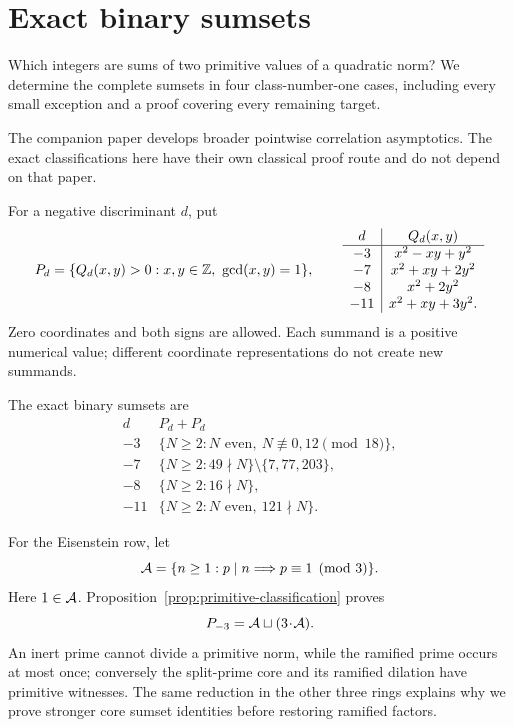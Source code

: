 \section{Exact binary sumsets}

Which integers are sums of two primitive values of a quadratic norm?
We determine the complete sumsets in four class-number-one cases,
including every small exception and a proof covering every remaining
target.

The companion paper \cite{pointwisecompanion} develops broader pointwise
correlation asymptotics. The exact classifications here have their own
classical proof route and do not depend on that paper.

For a negative discriminant $d$, put
\[
 P_d=\{Q_d(x,y)>0:x,y\in\Z,\ \gcd(x,y)=1\},\qquad
 \begin{array}{c|c}
 d&Q_d(x,y)\\\hline
 -3&x^2-xy+y^2\\
 -7&x^2+xy+2y^2\\
 -8&x^2+2y^2\\
 -11&x^2+xy+3y^2.
 \end{array}
\]
Zero coordinates and both signs are allowed.  Each summand is a positive
numerical value; different coordinate representations do not create
new summands.

\begin{theorem}\label{thm:exact-overview}
The exact binary sumsets are
\[
\begin{array}{c|l}
 d&P_d+P_d\\\hline
 -3&\{N\ge2:N\text{ even},\ N\not\equiv0,12\pmod{18}\},\\
 -7&\{N\ge2:49\nmid N\}\setminus\{7,77,203\},\\
 -8&\{N\ge2:16\nmid N\},\\
 -11&\{N\ge2:N\text{ even},\ 121\nmid N\}.
\end{array}
\]
\end{theorem}

For the Eisenstein row, let
\[
 \AA=\{n\ge1:p\mid n\Longrightarrow p\equiv1\pmod3\}.
\]
Here \(1\in\AA\). Proposition~\ref{prop:primitive-classification} proves
\[
                    P_{-3}=\AA\sqcup(3\!\cdot\!\AA).
\]
An inert prime cannot divide a primitive norm, while the ramified
prime occurs at most once; conversely the split-prime core and its
ramified dilation have primitive witnesses. The same reduction in
the other three rings explains why we prove stronger core sumset
identities before restoring ramified factors.

